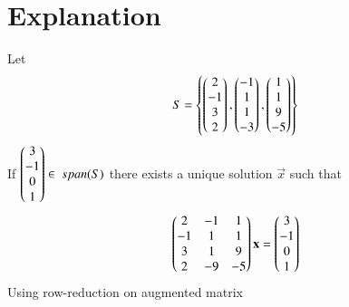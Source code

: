 \documentclass[journal,12pt,twocolumn]{IEEEtran}
\begin{document}
\section{Explanation}
Let
\begin{align}
	S=\left\{\begin{pmatrix}2\\-1\\3\\2\end{pmatrix},\begin{pmatrix}-1\\1\\1\\-3\end{pmatrix},\begin{pmatrix}1\\1\\9\\-5\end{pmatrix}\right\}
\end{align}
If $\begin{pmatrix}3\\-1\\0\\1\end{pmatrix} \in \ span(S)$ there exists a unique solution $\vec{x}$  such that
\begin{align}
	\begin{pmatrix}2 & -1 & 1 \\
	      -1 & 1 & 1 \\
	      3 & 1 & 9 \\
	      2 & -9 & -5\end{pmatrix}\mathbf{x} = \begin{pmatrix}3\\-1\\0\\1\end{pmatrix}
\end{align}
Using row-reduction on augmented matrix
\end{document}
